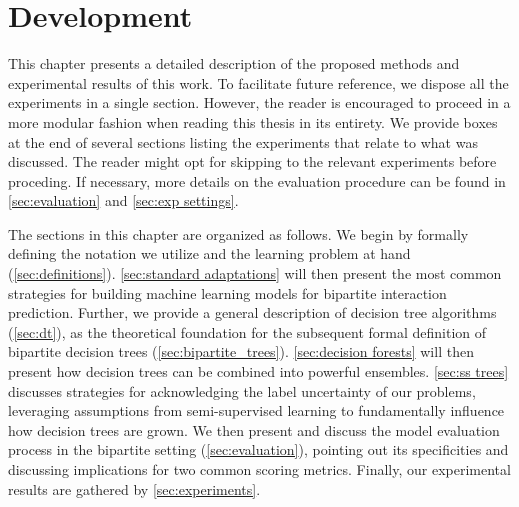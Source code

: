 


\chapter{Development}
\label{cap:development}

This chapter presents a detailed description of the proposed methods and experimental results of this work.
To facilitate future reference, we dispose all the experiments in a single section. However, the reader is encouraged to proceed in a more modular fashion when reading this thesis in its entirety. We provide boxes at the end of several sections listing the experiments that relate to what was discussed.
The reader might opt for skipping to the relevant experiments before proceding.
If necessary, more details on the evaluation procedure can be found in \autoref{sec:evaluation} and \autoref{sec:exp settings}.

The sections in this chapter are organized as follows.
We begin by formally defining the notation we utilize and the learning problem at hand (\autoref{sec:definitions}).
\autoref{sec:standard adaptations} will then present the most common strategies for building machine learning models for bipartite interaction prediction.
Further, we provide a general description of decision tree algorithms (\autoref{sec:dt}), as the theoretical foundation for the subsequent formal definition of bipartite decision trees (\autoref{sec:bipartite_trees}). \autoref{sec:decision forests} will then present how decision trees can be combined into powerful ensembles. \autoref{sec:ss trees} discusses strategies for acknowledging the label uncertainty of our problems, leveraging assumptions from semi-supervised learning to fundamentally influence how decision trees are grown.
We then present and discuss the model evaluation process in the bipartite setting (\autoref{sec:evaluation}), pointing out its specificities and discussing implications for two common scoring metrics.
Finally, our experimental results are gathered by \autoref{sec:experiments}.


